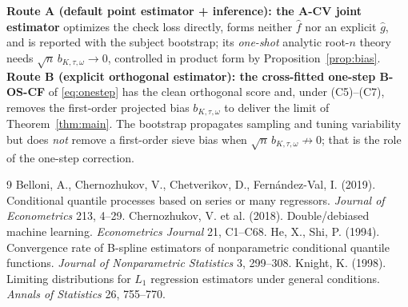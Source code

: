 \begin{remark}\label{rem:routes}
\textbf{Route A (default point estimator + inference): the A-CV joint
estimator} optimizes the check loss directly, forms neither $\widehat f$ nor an
explicit $\widehat g$, and is reported with the subject bootstrap; its
\emph{one-shot} analytic root-$n$ theory needs $\sqrt n\,b_{K,\tau,\omega}\to0$,
controlled in product form by Proposition~\ref{prop:bias}.
\textbf{Route B (explicit orthogonal estimator): the cross-fitted one-step
B-OS-CF} of \eqref{eq:onestep} has the clean orthogonal score and, under
(C5)--(C7), removes the first-order projected bias $b_{K,\tau,\omega}$ to deliver
the limit of Theorem~\ref{thm:main}. The bootstrap propagates sampling and
tuning variability but does \emph{not} remove a first-order sieve bias when
$\sqrt n\,b_{K,\tau,\omega}\not\to0$; that is the role of the one-step
correction.
\end{remark}

\begin{thebibliography}{9}
 Belloni, A., Chernozhukov, V.,
Chetverikov, D., Fern\'andez-Val, I. (2019). Conditional quantile processes
based on series or many regressors. \emph{Journal of Econometrics} 213, 4--29.
 Chernozhukov, V. et al.
(2018). Double/debiased machine learning. \emph{Econometrics Journal} 21,
C1--C68.
 He, X., Shi, P. (1994). Convergence rate of
B-spline estimators of nonparametric conditional quantile functions.
\emph{Journal of Nonparametric Statistics} 3, 299--308.
 Knight, K. (1998). Limiting distributions for
$L_1$ regression estimators under general conditions. \emph{Annals of Statistics}
26, 755--770.
\end{thebibliography}
